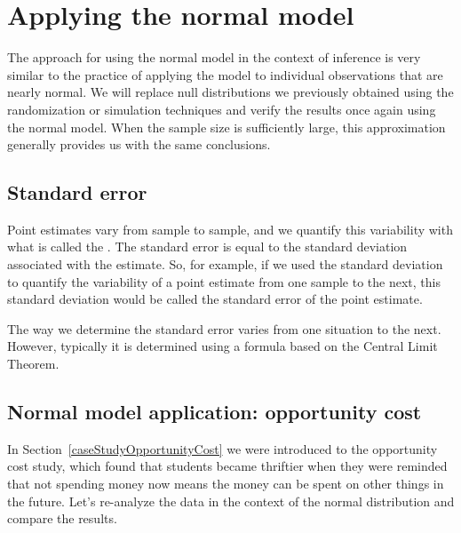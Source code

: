 \section{Applying the normal model}
\label{ApplyingTheNormalModel}

The approach for using the normal model in the context of inference is very similar to the practice of applying the model to individual observations that are nearly normal. We will replace null distributions we previously obtained using the randomization or simulation techniques and verify the results once again using the normal model. When the sample size is sufficiently large, this approximation generally provides us with the same conclusions.

\subsection{Standard error}

Point estimates vary from sample to sample, and we quantify this variability with what is called the . The standard error is equal to the standard deviation associated with the estimate. So, for example, if we used the standard deviation to quantify the variability of a point estimate from one sample to the next, this standard deviation would be called the standard error of the point estimate.


The way we determine the standard error varies from one situation to the next. However, typically it is determined using a formula based on the Central Limit Theorem.


\subsection{Normal model application: opportunity cost}

In Section~\ref{caseStudyOpportunityCost} we were introduced to the opportunity cost study, which found that students became thriftier when they were reminded that not spending money now means the money can be spent on other things in the future. Let's re-analyze the data in the context of the normal distribution and compare the results.

